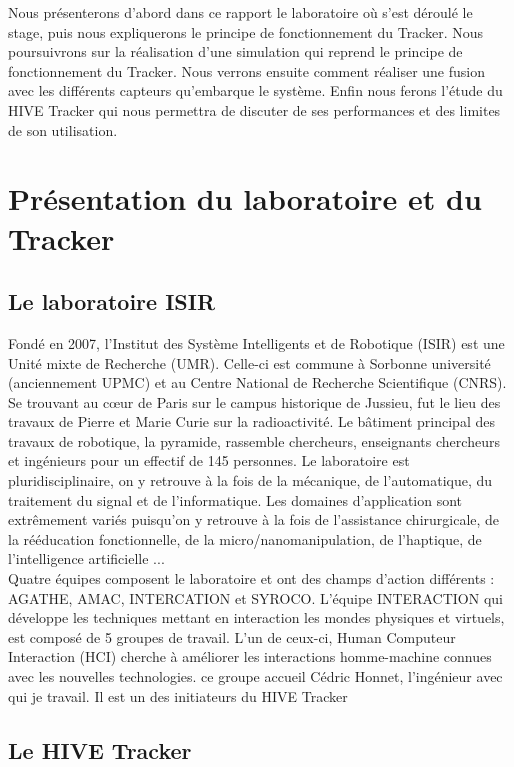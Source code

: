 \documentclass[10pt]{report}
\begin{document}
Nous présenterons d'abord dans ce rapport le laboratoire où s'est déroulé le stage, puis nous expliquerons le principe de fonctionnement du Tracker. Nous poursuivrons sur la réalisation d'une simulation qui reprend le principe de fonctionnement du Tracker. Nous verrons ensuite comment réaliser une fusion avec les différents capteurs qu'embarque le système. Enfin nous ferons l'étude du HIVE Tracker qui nous permettra de discuter de ses performances et des limites de son utilisation.

	
\chapter{Présentation du laboratoire et du Tracker}

\section{Le laboratoire ISIR}

Fondé en 2007, l'Institut des Système Intelligents et de Robotique (ISIR) est une Unité mixte de Recherche (UMR). Celle-ci est commune à Sorbonne université (anciennement UPMC) et au Centre National de Recherche Scientifique (CNRS). Se trouvant au cœur de Paris sur le campus historique de Jussieu, fut le lieu des travaux de Pierre et Marie Curie sur la radioactivité. Le bâtiment principal des travaux de robotique, la pyramide, rassemble chercheurs, enseignants chercheurs et ingénieurs pour un effectif de 145 personnes. Le laboratoire est pluridisciplinaire, on y retrouve à la fois de la mécanique, de l'automatique, du traitement du signal et de l’informatique. Les domaines d'application sont extrêmement variés puisqu'on y retrouve à la fois de l'assistance chirurgicale, de la rééducation fonctionnelle, de la micro/nanomanipulation, de l'haptique, de l'intelligence artificielle ...\\

Quatre équipes composent le laboratoire et ont des champs d'action différents : AGATHE, AMAC, INTERCATION et SYROCO. L'équipe INTERACTION qui développe les techniques mettant en interaction les mondes physiques et virtuels, est composé de 5 groupes de travail. L'un de ceux-ci, Human Computeur Interaction (HCI) cherche à améliorer les interactions homme-machine connues avec les nouvelles technologies. ce groupe accueil Cédric Honnet, l'ingénieur avec qui je travail. Il est un des initiateurs du HIVE Tracker

\section{Le HIVE Tracker}
\end{document}
